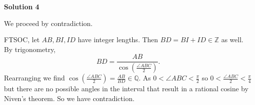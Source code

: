 \begin{enumerate}
 



\textbf{Solution 4}

We proceed by contradiction.

 FTSOC, let $AB, BI, ID$ have integer lengths. Then $BD = BI + ID \in \mathbb{Z}$ as well. By trigonometry, 
 \[BD = \frac{AB}{\cos{(\frac{\angle ABC}{2})}}.\]Rearranging we find $\cos{(\frac{\angle ABC}{2})} = \frac{AB}{BD} \in \mathbb{Q}$. As $0 < \angle ABC < \frac{\pi}{2}$ so $0 < \frac{\angle ABC}{2} < \frac{\pi}{4}$ but there are no possible angles in the interval that result in a rational cosine by Niven's theorem. So we have contradiction.

 


\end{enumerate}